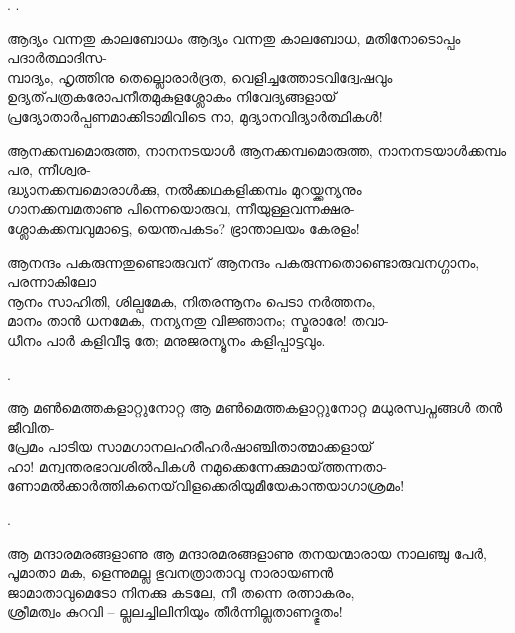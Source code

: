 \begin{enumerate}


.
.



\begin{slokam}{\VSv}{\PCM}{ആദ്യം വന്നതു കാലബോധം}
ആദ്യം വന്നതു കാലബോധ, മതിനോടൊപ്പം പദാര്‍ത്ഥാദിസ-\\
മ്പാദ്യം, ഹൃത്തിനു തെല്ലൊരാര്‍ദ്രത, വെളിച്ചത്തോടവിദ്വേഷവും\\
ഉദ്യത്‌പത്രകരോപനീതമുകുളശ്ലോകം നിവേദ്യങ്ങളായ്‌\\
പ്രദ്യോതാര്‍പ്പണമാക്കിടാമിവിടെ നാ, മുദ്യാനവിദ്യാര്‍ത്ഥികള്‍!
\end{slokam}



\begin{slokam}{\VSv}{\TMV}{ആനക്കമ്പമൊരുത്ത, നാനനടയാൾ}
ആനക്കമ്പമൊരുത്ത, നാനനടയാള്‍ക്കമ്പം പര, ന്നീശ്വര-\\
ദ്ധ്യാനക്കമ്പമൊരാള്‍ക്കു, നൽക്കഥകളിക്കമ്പം മുറയ്ക്കന്യനും\\
ഗാനക്കമ്പമതാണു പിന്നെയൊരുവ, ന്നീയുള്ളവന്നക്ഷര-\\
ശ്ലോകക്കമ്പവുമാട്ടെ, യെന്തപകടം? ഭ്രാന്താലയം കേരളം!
\end{slokam}


\begin{slokam}{\VSv}{\KJ}{ആനന്ദം പകരുന്നതുണ്ടൊരുവന്}
ആനന്ദം പകരുന്നതൊണ്ടൊരുവനഗ്ഗാനം, പരന്നാകിലോ \\
നൂനം സാഹിതി, ശില്പമേക, നിതരന്നൂനം പെടാ നർത്തനം, \\
മാനം താൻ ധനമേക, നന്യനതു വിജ്ഞാനം; സ്മരാരേ! തവാ-\\
ധീനം പാർ കളിവീടു തേ; മനുജരന്യൂനം കളിപ്പാട്ടവും. 
\end{slokam}


. 

\begin{slokam}{\VSv}{\VRV}{ആ മൺമെത്തകളാറ്റുനോറ്റ}
ആ മൺമെത്തകളാറ്റുനോറ്റ മധുരസ്വപ്നങ്ങള്‍ തൻ ജീവിത-\\
പ്രേമം പാടിയ സാമഗാനലഹരീഹർഷാഞ്ചിതാത്മാക്കളായ്‌\\
ഹാ! മന്വന്തരഭാവശിൽപികള്‍ നമുക്കെന്നേക്കുമായ്‌ത്തന്നതാ-\\
ണോമൽക്കാർത്തികനെയ്‌വിളക്കെരിയുമീയേകാന്തയാഗാശ്രമം!
\end{slokam}


.


\begin{slokam}{\VSv}{\GRT}{ആ മന്ദാരമരങ്ങളാണു}
ആ മന്ദാരമരങ്ങളാണു തനയന്മാരായ നാലഞ്ചു പേര്‍,\\
പൂമാതാ മക, ളെന്നുമല്ല ഭുവനത്രാതാവു നാരായണന്‍\\
ജാമാതാവുമെടോ നിനക്കു കടലേ, നീ തന്നെ രത്നാകരം,\\
ശ്രീമത്വം കുറവി -- ല്ലലച്ചിലിനിയും തീര്‍ന്നില്ലതാണദ്ഭുതം!
\end{slokam}


\end{enumerate}
